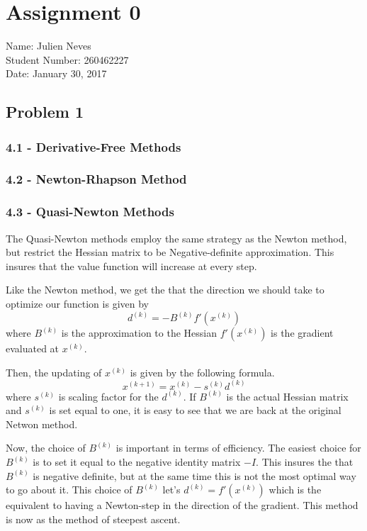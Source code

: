 \documentclass{article}
\begin{document}
\section*{Assignment 0}
Name: Julien Neves
\\Student Number: 260462227
\\Date: January 30, 2017

\subsection*{Problem 1}

\subsubsection*{4.1 - Derivative-Free Methods}


\subsubsection*{4.2 - Newton-Rhapson Method}


\subsubsection*{4.3 - Quasi-Newton Methods}


The Quasi-Newton methods employ the same strategy as the Newton method, but restrict the Hessian matrix to be Negative-definite approximation. This insures that the value function will increase at every step.

Like the Newton method, we get the that the direction we should take to optimize our function is given by
$$
d^{(k)}= - B^{(k)}f'(x^{(k)})
$$
where $B^{(k)}$ is the approximation to the Hessian $f'(x^{(k)})$ is the gradient evaluated at $x^{(k)}$.

Then, the updating of $x^{(k)}$ is given by the following formula.
$$
x^{(k+1)}= x^{(k)}-s^{(k)}d^{(k)}
$$
where $s^{(k)}$ is scaling factor for the $d^{(k)}$. If $B^{(k)}$ is the actual Hessian matrix and $s^{(k)}$ is set equal to one, it is easy to see that we are back at the original Netwon method.

Now, the choice of $B^{(k)}$ is important in terms of efficiency. The easiest choice for $B^{(k)}$ is to set it equal to the negative identity matrix $-I$. This insures the that $B^{(k)}$ is negative definite, but at the same time this is not the most optimal way to go about it. This choice of $B^{(k)}$ let's $d^{(k)}= f'(x^{(k)})$ which is the equivalent to having a Newton-step in the direction of the gradient. This method is now as the method of steepest ascent. 
\end{document}
